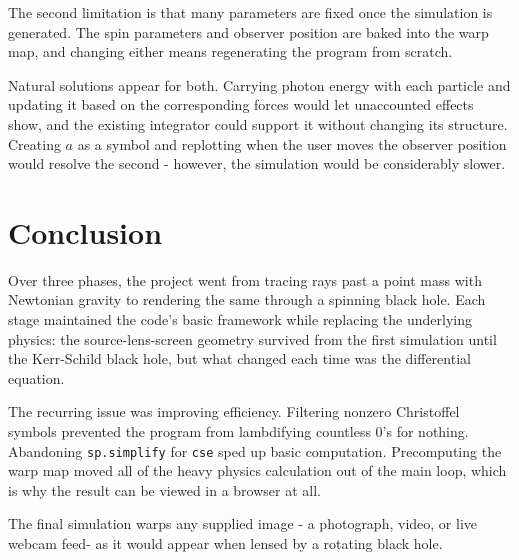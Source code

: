 \documentclass[11pt,a4paper]{article}
\begin{document}
The second limitation is that many parameters are fixed once the simulation is generated. The spin parameters and observer position are baked into the warp map, and changing either means regenerating the program from scratch.

Natural solutions appear for both. Carrying photon energy with each particle and updating it based on the corresponding forces would let unaccounted effects show, and the existing integrator could support it without changing its structure. Creating $a$ as a symbol and replotting when the user moves the observer position would resolve the second - however, the simulation would be considerably slower.

\section{Conclusion}
\label{sec:conclusion}

Over three phases, the project went from tracing rays past a point mass with Newtonian gravity to rendering the same through a spinning black hole. Each stage maintained the code's basic framework while replacing the underlying physics: the source-lens-screen geometry survived from the first simulation until the Kerr-Schild black hole, but what changed each time was the differential equation.

The recurring issue was improving efficiency. Filtering nonzero Christoffel symbols prevented the program from lambdifying countless $0$'s for nothing. Abandoning \texttt{sp.simplify} for \texttt{cse} sped up basic computation. Precomputing the warp map moved all of the heavy physics calculation out of the main loop, which is why the result can be viewed in a browser at all.

The final simulation warps any supplied image - a photograph, video, or live webcam feed- as it would appear when lensed by a rotating black hole.
\end{document}

